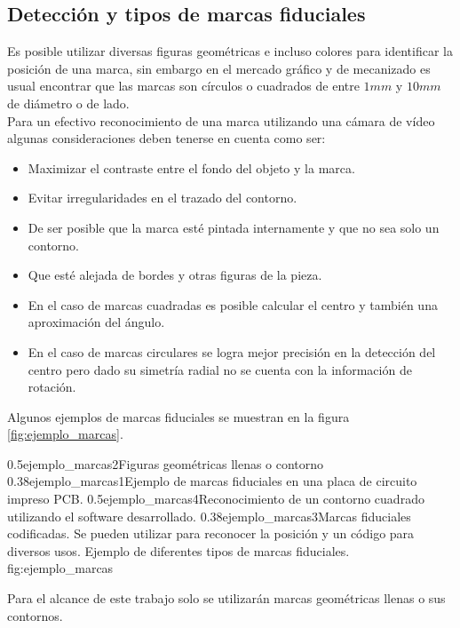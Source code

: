 \subsection{Detección y tipos de marcas fiduciales}
   Es posible utilizar diversas figuras geométricas e incluso colores para identificar la posición de una marca, sin embargo en el mercado gráfico y de mecanizado es usual encontrar que las marcas son círculos o cuadrados de entre $1mm$ y $10mm$ de diámetro o de lado.\\
   Para un efectivo reconocimiento de una marca utilizando una cámara de vídeo algunas consideraciones deben tenerse en cuenta como ser:
   \begin{itemize}
      \item{Maximizar el contraste entre el fondo del objeto y la marca.}
      \item{Evitar irregularidades en el trazado del contorno.}
      \item{De ser posible que la marca esté pintada internamente y que no sea solo un contorno.}
      \item{Que esté alejada de bordes y otras figuras de la pieza.}
      \item{En el caso de marcas cuadradas es posible calcular el centro y también una aproximación del ángulo.}
      \item{En el caso de marcas circulares se logra mejor precisión en la detección del centro pero dado su simetría radial no se cuenta con la información de rotación.}
   \end{itemize}
   Algunos ejemplos de marcas fiduciales se muestran en la figura \ref{fig:ejemplo_marcas}.

\subfigtwotwo
            {0.5}{ejemplo_marcas2}{Figuras geométricas llenas o contorno} 
            {0.38}{ejemplo_marcas1}{Ejemplo de marcas fiduciales en una placa de circuito impreso PCB.}
            {0.5}{ejemplo_marcas4}{Reconocimiento de un contorno cuadrado utilizando el software desarrollado.}
            {0.38}{ejemplo_marcas3}{Marcas fiduciales codificadas. Se pueden utilizar para reconocer la posición y un código para diversos usos.}
            {Ejemplo de diferentes tipos de marcas fiduciales.}
            {fig:ejemplo_marcas}

         Para el alcance de este trabajo solo se utilizarán marcas geométricas llenas o sus contornos.

